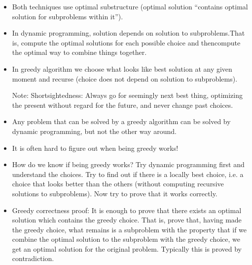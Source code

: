 \documentclass[11pt]{article}
\begin{document}
\begin{itemize}
\item Both techniques use optimal substructure (optimal solution
  ``contains optimal solution for subproblems within it'').
\item In dynamic programming, solution depends on solution to
  subproblems.That is, compute the optimal solutions for each possible
  choice and thencompute the optimal way to combine things together.
\item In greedy algorithm we choose what looks like best solution at
  any given moment and recurse (choice does not depend on solution to
  subproblems).


Note: Shortsightedness: Always go for seemingly next best thing,
optimizing the present without regard for the future, and never change
past choices.


\item Any problem that can be solved by a greedy algorithm can be
solved by dynamic programming, but not the other way around.

\item It is often hard to figure out when being greedy works!

\item How do we know if being greedy works?  Try dynamic programming
first and understand the choices. Try to find out if there is a
locally best choice, i.e. a choice that looks better than the others
(without computing recursive solutions to subproblems). Now try to
prove that it works correctly.

\item Greedy correctness proof: It is enough to prove that there
exists an optimal solution which contains the greedy choice.  That is,
prove that, having made the greedy choice, what remains is a
subproblem with the property that if we combine the optimal solution
to the subproblem with the greedy choice, we get an optimal solution
for the original problem.  Typically this is proved by contradiction.
\end{itemize}
  
\end{document}
